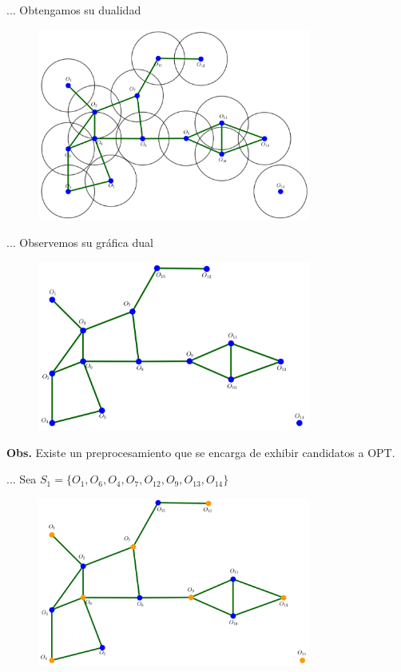 \begin{frame}{...}
  Obtengamos su dualidad
  \begin{figure}  
    \centering
    \includegraphics[width=0.8\textwidth]{./Images/02.png}
  \end{figure}
\end{frame}

\begin{frame}{...}
  Observemos su gráfica dual
  \begin{figure}  
    \centering
    \includegraphics[width=0.8\textwidth]{./Images/SET.png}
  \end{figure}
  \textbf{Obs.} Existe un preprocesamiento que se encarga de exhibir candidatos a OPT.
\end{frame}

\begin{frame}{...}
  Sea $S_1 = \{O_1, O_6, O_4, O_7, O_{12}, O_9, O_{13}, O_{14}\}$
  \begin{figure}  
    \centering
    \includegraphics[width=0.8\textwidth]{./Images/S1.png}
  \end{figure}
\end{frame}

